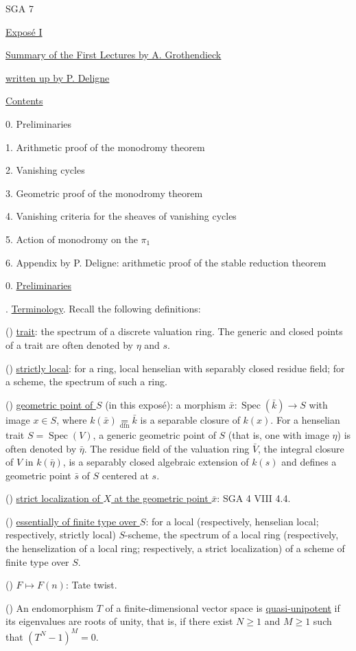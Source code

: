 

SGA 7

\underline{Expos\'e I}

\underline{\underline{Summary of the First Lectures by A. Grothendieck}}

\underline{written up by P. Deligne}

\underline{Contents}

0. Preliminaries

1. Arithmetic proof of the monodromy theorem

2. Vanishing cycles

3. Geometric proof of the monodromy theorem

4. Vanishing criteria for the sheaves of vanishing cycles

5. Action of monodromy on the $\pi_1$

6. Appendix by P. Deligne: arithmetic proof of the stable reduction theorem

0. \underline{Preliminaries}

. \underline{Terminology}. Recall the following definitions:

() \underline{trait}: the spectrum of a discrete valuation ring. The generic and closed points of a trait are often denoted by $\eta$ and $s$.

() \underline{strictly local}: for a ring, local henselian with separably closed residue field; for a scheme, the spectrum of such a ring.

() \underline{geometric point of $S$} (in this expos\'e): a morphism $\bar{x}:\operatorname{Spec}(\bar{k})\longrightarrow S$ with image $x\in S$, where $k(\bar{x})\underset{\mathrm{dfn}}{=}\bar{k}$ is a separable closure of $k(x)$. For a henselian trait $S=\operatorname{Spec}(V)$, a generic geometric point of $S$ (that is, one with image $\eta$) is often denoted by $\bar{\eta}$. The residue field of the valuation ring $\bar{V}$, the integral closure of $V$ in $k(\bar{\eta})$, is a separably closed algebraic extension of $k(s)$ and defines a geometric point $\bar{s}$ of $S$ centered at $s$.


() \underline{strict localization of $X$ at the geometric point $\bar{x}$}: SGA 4 VIII 4.4.

() \underline{essentially of finite type over $S$}: for a local (respectively, henselian local; respectively, strictly local) $S$-scheme, the spectrum of a local ring (respectively, the henselization of a local ring; respectively, a strict localization) of a scheme of finite type over $S$.

() $F\longmapsto F(n)$: Tate twist.

() An endomorphism $T$ of a finite-dimensional vector space is \underline{quasi-unipotent} if its eigenvalues are roots of unity, that is, if there exist $N\geqslant 1$ and $M\geqslant 1$ such that $(T^N-1)^M=0$.
